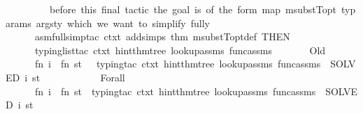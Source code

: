 \begin{isabellebody}
\ \ \ \ \ \ \ \ {\isacharparenleft}{\kern0pt}{\isacharasterisk}{\kern0pt}\ before\ this\ final\ tactic\ the\ goal\ is\ of\ the\ form\ {\isasymopen}map\ {\isacharparenleft}{\kern0pt}msubstT{\isacharunderscore}{\kern0pt}opt\ ty{\isacharunderscore}{\kern0pt}params{\isacharparenright}{\kern0pt}\ args{\isacharunderscore}{\kern0pt}ty{\isasymclose}{\isacharcomma}{\kern0pt}\ which\ we\ want\ to\ simplify\ fully\ {\isacharasterisk}{\kern0pt}{\isacharparenright}{\kern0pt}\isanewline
\ \ \ \ \ \ asm{\isacharunderscore}{\kern0pt}full{\isacharunderscore}{\kern0pt}simp{\isacharunderscore}{\kern0pt}tac\ {\isacharparenleft}{\kern0pt}ctxt\ addsimps\ {\isacharbrackleft}{\kern0pt}{\isacharat}{\kern0pt}{\isacharbraceleft}{\kern0pt}thm\ msubstT{\isacharunderscore}{\kern0pt}opt{\isacharunderscore}{\kern0pt}def{\isacharbraceright}{\kern0pt}{\isacharbrackright}{\kern0pt}{\isacharparenright}{\kern0pt}\ THEN{\isacharprime}{\kern0pt}\isanewline
\ \ \ \ \ \ typing{\isacharunderscore}{\kern0pt}list{\isacharunderscore}{\kern0pt}tac\ ctxt\ hint{\isacharunderscore}{\kern0pt}thm{\isacharunderscore}{\kern0pt}tree\ lookup{\isacharunderscore}{\kern0pt}assms\ func{\isacharunderscore}{\kern0pt}assms{\isacharcomma}{\kern0pt}\isanewline
\isanewline
\ \ \ \ \ \ {\isacharparenleft}{\kern0pt}{\isacharasterisk}{\kern0pt}\ Old\ {\isacharasterisk}{\kern0pt}{\isacharparenright}{\kern0pt}\isanewline
\ \ \ \ \ \ fn\ i\ {\isacharequal}{\kern0pt}{\isachargreater}{\kern0pt}\ fn\ st\ \ {\isacharequal}{\kern0pt}{\isachargreater}{\kern0pt}\ {\isacharparenleft}{\kern0pt}{\isacharparenleft}{\kern0pt}typing{\isacharunderscore}{\kern0pt}tac\ ctxt\ hint{\isacharunderscore}{\kern0pt}thm{\isacharunderscore}{\kern0pt}tree\ lookup{\isacharunderscore}{\kern0pt}assms\ func{\isacharunderscore}{\kern0pt}assms{\isacharparenright}{\kern0pt}\ {\isacharbar}{\kern0pt}{\isachargreater}{\kern0pt}\ SOLVED{\isacharprime}{\kern0pt}{\isacharparenright}{\kern0pt}\ i\ st{\isacharcomma}{\kern0pt}\isanewline
\ \ \ \ \isanewline
\ \ \ \ \ \ {\isacharparenleft}{\kern0pt}{\isacharasterisk}{\kern0pt}\ Forall\ {\isacharasterisk}{\kern0pt}{\isacharparenright}{\kern0pt}\isanewline
\ \ \ \ \ \ fn\ i\ {\isacharequal}{\kern0pt}{\isachargreater}{\kern0pt}\ fn\ st\ {\isacharequal}{\kern0pt}{\isachargreater}{\kern0pt}\ {\isacharparenleft}{\kern0pt}{\isacharparenleft}{\kern0pt}typing{\isacharunderscore}{\kern0pt}tac\ ctxt\ hint{\isacharunderscore}{\kern0pt}thm{\isacharunderscore}{\kern0pt}tree\ lookup{\isacharunderscore}{\kern0pt}assms\ func{\isacharunderscore}{\kern0pt}assms{\isacharparenright}{\kern0pt}\ {\isacharbar}{\kern0pt}{\isachargreater}{\kern0pt}\ SOLVED{\isacharprime}{\kern0pt}{\isacharparenright}{\kern0pt}\ i\ st{\isacharcomma}{\kern0pt}\isanewline

\end{isabellebody}

